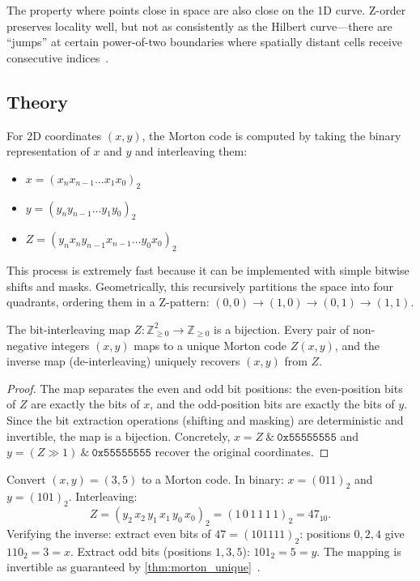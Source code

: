 \begin{definition}\label{def:z_order_locality}
The property where points close in space are also close on the 1D curve. Z-order preserves locality well, but not as consistently as the Hilbert curve---there are ``jumps'' at certain power-of-two boundaries where spatially distant cells receive consecutive indices~\cite{samet1984}.
\end{definition}

\subsection{Theory}
For 2D coordinates $(x, y)$, the Morton code is computed by taking the binary representation of $x$ and $y$ and interleaving them:
\begin{itemize}
    \item $x = (x_n x_{n-1} \dots x_1 x_0)_2$
    \item $y = (y_n y_{n-1} \dots y_1 y_0)_2$
    \item $Z = (y_n x_n y_{n-1} x_{n-1} \dots y_0 x_0)_2$
\end{itemize}

This process is extremely fast because it can be implemented with simple bitwise shifts and masks. Geometrically, this recursively partitions the space into four quadrants, ordering them in a Z-pattern: $(0,0) \to (1,0) \to (0,1) \to (1,1)$.

\begin{theorem}\label{thm:morton_unique}
The bit-interleaving map $Z \colon \mathbb{Z}_{\ge 0}^2 \to \mathbb{Z}_{\ge 0}$ is a bijection. Every pair of non-negative integers $(x, y)$ maps to a unique Morton code $Z(x, y)$, and the inverse map (de-interleaving) uniquely recovers $(x, y)$ from $Z$.
\end{theorem}

\begin{proof}
The map separates the even and odd bit positions: the even-position bits of $Z$ are exactly the bits of $x$, and the odd-position bits are exactly the bits of $y$. Since the bit extraction operations (shifting and masking) are deterministic and invertible, the map is a bijection. Concretely, $x = Z \ \& \ \texttt{0x55555555}$ and $y = (Z \gg 1) \ \& \ \texttt{0x55555555}$ recover the original coordinates.
\end{proof}

\begin{example}\label{ex:morton_code}
Convert $(x, y) = (3, 5)$ to a Morton code. In binary: $x = (011)_2$ and $y = (101)_2$.
Interleaving:
\[
Z = (y_2 \, x_2 \, y_1 \, x_1 \, y_0 \, x_0)_2 = (1 \, 0 \, 1 \, 1 \, 1 \, 1)_2 = 47_{10}.
\]
Verifying the inverse: extract even bits of $47 = (101111)_2$: positions $0,2,4$ give $110_2 = 3 = x$. Extract odd bits (positions $1,3,5$): $101_2 = 5 = y$. The mapping is invertible as guaranteed by \cref{thm:morton_unique}~\cite{morton1966}.
\end{example}

